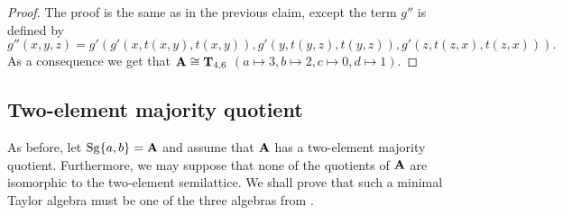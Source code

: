 \documentclass[11pt]{amsart}
\newcommand{\m}[1]{\mathbf{\uppercase{#1}}}
\newcommand{\n}{\scriptscriptstyle{\mathsf{N}}}
\newcommand{\co}{\scriptscriptstyle{\mathsf{C}}}
\newtheorem{cor}[thm]{Corollary}
\theoremstyle{definition}
\theoremstyle{remark}
\theoremstyle{plain}
\begin{document}
\begin{proof}
The proof is the same as in the previous claim, except the term $g''$ is defined by $$g''(x,y,z)=g'(g'(x,t(x,y),t(x,y)),g'(y,t(y,z),t(y,z)),g'(z,t(z,x),t(z,x))).$$
As a consequence we get that $\m A\cong {\m T}_{4,6}$ $ (a\mapsto 3, b\mapsto 2, c\mapsto 0, d\mapsto 1)$.
\end{proof}


\subsection{Two-element majority quotient}\label{s:maj}
As before, let $\mathrm{Sg}\{a,b\}=\m a$ and assume that $\m a$ has a two-element majority quotient. Furthermore, we may suppose that none of the quotients of $\m a$ are isomorphic to the two-element semilattice. We shall prove that such a minimal Taylor algebra must be one of the three algebras from . 
\end{document}
